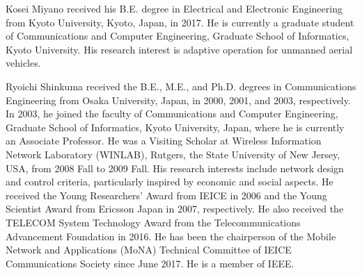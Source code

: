 \documentclass{ieeeaccess}
\begin{document}
\begin{IEEEbiography}{Kosei Miyano} received his B.E. degree in Electrical
and Electronic Engineering from Kyoto University,
Kyoto, Japan, in 2017. He is currently a graduate student of Communications and
Computer Engineering, Graduate School of Informatics,
Kyoto University. His research interest
is adaptive operation for unmanned aerial vehicles.
\end{IEEEbiography}



\begin{IEEEbiography}{Ryoichi Shinkuma} received the B.E., M.E., and
Ph.D. degrees in Communications Engineering
from Osaka University, Japan, in 2000, 2001, and
2003, respectively. In 2003, he joined the faculty
of Communications and Computer Engineering,
Graduate School of Informatics, Kyoto University,
Japan, where he is currently an Associate Professor. He was a Visiting Scholar at Wireless Information Network Laboratory (WINLAB), Rutgers,
the State University of New Jersey, USA, from
2008 Fall to 2009 Fall. His research interests include network design and
control criteria, particularly inspired by economic and social aspects. He
received the Young Researchers' Award from IEICE in 2006 and the Young
Scientist Award from Ericsson Japan in 2007, respectively. He also received
the TELECOM System Technology Award from the Telecommunications
Advancement Foundation in 2016. He has been the chairperson of the
Mobile Network and Applications (MoNA) Technical Committee of IEICE
Communications Society since June 2017. He is a member of IEEE.
\end{IEEEbiography}
\end{document}
